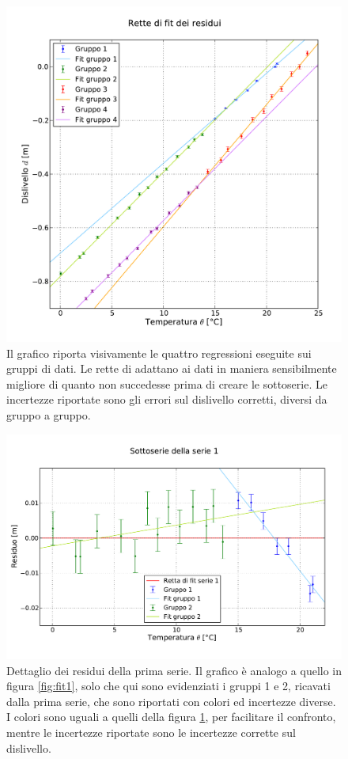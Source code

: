 \begin{figure}
    \centering
    \includegraphics[width=120mm]{immagini/residui.pdf}
    \caption{Il grafico riporta visivamente le quattro regressioni eseguite sui gruppi di dati.
    Le rette di adattano ai dati in maniera sensibilmente migliore di quanto non succedesse prima
    di creare le sottoserie. Le incertezze riportate sono gli errori sul dislivello corretti, diversi
    da gruppo a gruppo. }
    \label{fig:residui}
\end{figure}

\begin{figure}[p]
    \centering
    \includegraphics[width=130mm]{immagini/fit1r.pdf}
    \caption{Dettaglio dei residui della prima serie. Il grafico è analogo a quello in figura \ref{fig:fit1},
    solo che qui sono evidenziati i gruppi 1 e 2, ricavati dalla prima serie, che sono
    riportati con colori ed incertezze diverse. I colori sono uguali a quelli della figura \ref{fig:residui},
    per facilitare il confronto, mentre le incertezze riportate sono le incertezze corrette sul dislivello.}
    \label{fig:fit1r}
\end{figure}

